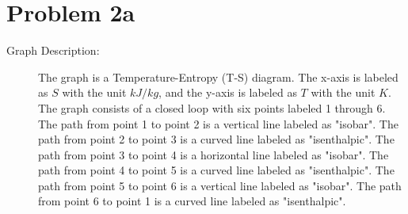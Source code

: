 \section*{Problem 2a}

\begin{description}
    \item[Graph Description:] The graph is a Temperature-Entropy (T-S) diagram. The x-axis is labeled as $S$ with the unit $kJ/kg$, and the y-axis is labeled as $T$ with the unit $K$. The graph consists of a closed loop with six points labeled 1 through 6. The path from point 1 to point 2 is a vertical line labeled as "isobar". The path from point 2 to point 3 is a curved line labeled as "isenthalpic". The path from point 3 to point 4 is a horizontal line labeled as "isobar". The path from point 4 to point 5 is a curved line labeled as "isenthalpic". The path from point 5 to point 6 is a vertical line labeled as "isobar". The path from point 6 to point 1 is a curved line labeled as "isenthalpic".
\end{description}